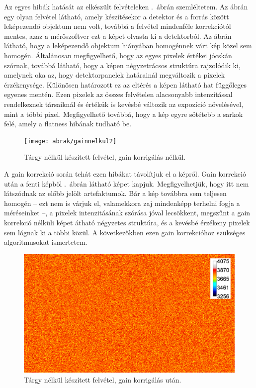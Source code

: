 \documentclass[a4paper,12pt]{article}
\begin{document}
Az egyes hibák hatását az elkészült felvételeken .~ábrán szemléltetem. Az ábrán egy olyan felvétel látható, amely készítésekor a detektor és a forrás között leképezendő objektum nem volt, továbbá a felvétel mindenféle korrekciótól mentes, azaz a mérőszoftver ezt a képet olvasta ki a detektorból. Az ábrán látható, hogy a leképezendő objektum hiányában homogénnek várt kép közel sem homogén. Általánosan megfigyelhető, hogy az egyes pixelek értékei jócskán szórnak, továbbá látható, hogy a képen négyzetrácsos struktúra rajzolódik ki, amelynek oka  az, hogy detektorpanelek határainál megváltozik a pixelek érzékenysége. Különösen határozott ez az eltérés a képen látható hat függőleges egyenes mentén. Ezen pixelek az összes felvételen alacsonyabb intenzitással rendelkeznek társaiknál és értékük is kevésbé változik az expozíció növelésével, mint a többi pixel. Megfigyelhető továbbá, hogy a kép egyre sötétebb a sarkok felé, amely a flatness hibának tudható be.

\begin{figure}[htbp]
\center
\texttt{[image: abrak/gainnelkul2]}
\caption{Tárgy nélkül készített felvétel, gain korrigálás nélkül.}
\label{fig:gainnelkul}
\end{figure}

A gain korrekció során tehát ezen hibákat távolítjuk el a képről. Gain korrekció után a fenti képből .~ábrán látható képet kapjuk. Megfigyelhetjük, hogy itt nem látszódnak az előbb jelölt artefaktumok. Bár a kép továbbra sem teljesen homogén -- ezt nem is várjuk el, valamekkora zaj mindenképp terhelni fogja a méréseinket --, a pixelek intenzitásának szórása jóval lecsökkent, megszűnt a gain korrekció nélküli képet átható négyzetes struktúra, és a kevésbé érzékeny pixelek sem lógnak ki a többi közül. A következőkben ezen  gain korrekcióhoz szükséges algoritmusokat ismertetem.

\begin{figure}[htbp]
\center
\includegraphics[width=1.0\textwidth]{abrak/gainnel}
\caption{Tárgy nélkül készített felvétel, gain korrigálás után.}
\label{fig:gainnel}
\end{figure}
\end{document}
